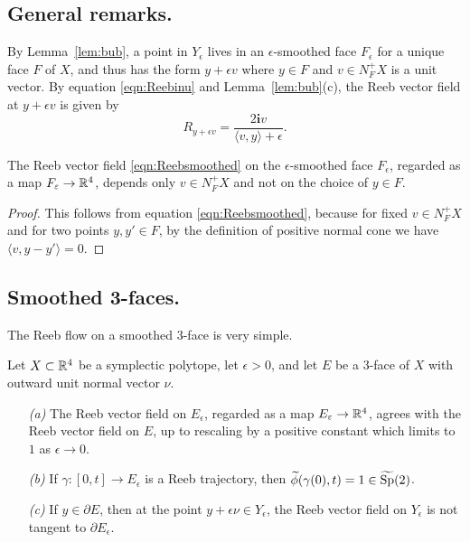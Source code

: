 \subsection*{General remarks.}

By Lemma~\ref{lem:bub}, a point in $Y_\epsilon$ lives in an $\epsilon$-smoothed face $F_\epsilon$ for a unique face $F$ of $X$, and thus has the form $y+\epsilon v$ where $y\in F$ and $v\in N_F^+X$ is a unit vector. By equation \eqref{eqn:Reebinu} and Lemma~\ref{lem:bub}(c), the Reeb vector field at $y+\epsilon v$ is given by
\begin{equation}
\label{eqn:Reebsmoothed}
R_{y+\epsilon v} = \frac{2{\mathbf i}v}{\langle v,y\rangle + \epsilon}.
\end{equation}

\begin{lemma}
\label{lem:transinv}
The Reeb vector field \eqref{eqn:Reebsmoothed} on the $\epsilon$-smoothed face $F_\epsilon$, regarded as a map $F_\varepsilon\to {\mathbb R}^4$, depends only $v\in N_F^+X$ and not on the choice of $y\in F$.
\end{lemma}

\begin{proof}
This follows from equation \eqref{eqn:Reebsmoothed}, because for fixed $v\in N_F^+X$ and for two points $y,y'\in F$, by the definition of positive normal cone we have $\langle v,y-y'\rangle = 0$.
\end{proof}

\subsection*{Smoothed 3-faces.} The Reeb flow on a smoothed $3$-face is very simple.

\begin{lemma}
\label{lem:smoothed3face}
Let $X\subset{\mathbb R}^4$ be a symplectic polytope, let $\epsilon>0$, and let $E$ be a $3$-face of $X$ with outward unit normal vector $\nu$.
\begin{itemize}
\item[\emph{(a)}]
The Reeb vector field on $E_\epsilon$, regarded as a map $E_\varepsilon\to{\mathbb R}^4$, agrees with the Reeb vector field on $E$, up to rescaling by a positive constant which limits to $1$ as $\epsilon\to0$.
\item[\emph{(b)}]
If $\gamma:[0,t]\to E_\epsilon$ is a Reeb trajectory, then $\widetilde{\phi}(\gamma(0),t)=1\in\widetilde{\operatorname{Sp}}(2)$.
\item[\emph{(c)}]
If $y\in\partial E$, then at the point $y+\epsilon\nu\in Y_\epsilon$, the Reeb vector field on $Y_\epsilon$ is not tangent to $\partial E_\epsilon$.
\end{itemize}
\end{lemma}

